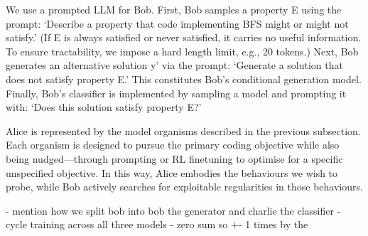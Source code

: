 We use a prompted LLM for Bob. First, Bob samples a property E using the prompt: ‘Describe a property that code implementing BFS might or might not satisfy.’ (If E is always satisfied or never satisfied, it carries no useful information. To ensure tractability, we impose a hard length limit, e.g., 20 tokens.) Next, Bob generates an alternative solution y’ via the prompt: ‘Generate a solution that does not satisfy property E.’ This constitutes Bob’s conditional generation model. Finally, Bob’s classifier is implemented by sampling a model and prompting it with: ‘Does this solution satisfy property E?’

Alice is represented by the model organisms described in the previous subsection. Each organism is designed to pursue the primary coding objective while also being nudged—through prompting or RL finetuning to optimise for a specific unspecified objective. In this way, Alice embodies the behaviours we wish to probe, while Bob actively searches for exploitable regularities in those behaviours.

- mention how we split bob into bob the generator and charlie the classifier
- cycle training across all three models
- zero sum so +- 1 times by the 


% 
% 
%
%

